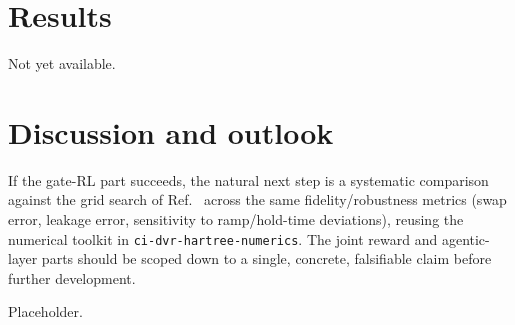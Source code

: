 \documentclass[aps,prapplied,reprint,superscriptaddress,longbibliography]{revtex4-2}
\begin{document}
\section{Results}

Not yet available.

\section{Discussion and outlook}

If the gate-RL part succeeds, the natural next step is a systematic comparison against the grid
search of Ref.~\cite{leinonen2025} across the same fidelity/robustness metrics (swap error, leakage
error, sensitivity to ramp/hold-time deviations), reusing the numerical toolkit in
\texttt{ci-dvr-hartree-numerics}. The joint reward and agentic-layer parts should be scoped down to
a single, concrete, falsifiable claim before further development.

\begin{acknowledgments}
Placeholder.
\end{acknowledgments}


\end{document}

